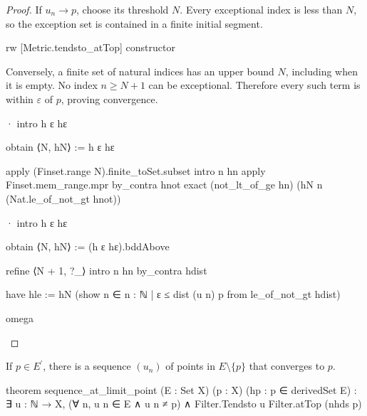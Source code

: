 \begin{proof}
  If $u_n\to p$, choose its threshold $N$.
  Every exceptional index is less than $N$, so the exception set is contained in a finite initial
  segment.

  \begin{lean}
    rw [Metric.tendsto_atTop]
    constructor
  \end{lean}

  Conversely, a finite set of natural indices has an upper bound $N$, including when it is empty.
  No index $n\geq N+1$ can be exceptional.
  Therefore every such term is within $\varepsilon$ of $p$, proving convergence.

  \begin{lean}
    · intro h ε hε

      obtain ⟨N, hN⟩ := h ε hε

      apply (Finset.range N).finite_toSet.subset
      intro n hn
      apply Finset.mem_range.mpr
      by_contra hnot
      exact (not_lt_of_ge hn) (hN n (Nat.le_of_not_gt hnot))

    · intro h ε hε

      obtain ⟨N, hN⟩ := (h ε hε).bddAbove

      refine ⟨N + 1, ?_⟩
      intro n hn
      by_contra hdist

      have hle := hN (show n ∈ {n : ℕ | ε ≤ dist (u n) p} from le_of_not_gt hdist)

      omega
  \end{lean}

\end{proof}

\begin{lemma}
  \label{ma:lem:sequence-at-limit-point}
  If $p\in E^{\prime}$, there is a sequence $(u_n)$ of points in $E\setminus\{p\}$ that converges
  to $p$.

  \begin{lean}
    theorem sequence_at_limit_point (E : Set X) (p : X) (hp : p ∈ derivedSet E) :
        ∃ u : ℕ → X, (∀ n, u n ∈ E ∧ u n ≠ p) ∧ Filter.Tendsto u Filter.atTop (nhds p)
  \end{lean}
\end{lemma}

